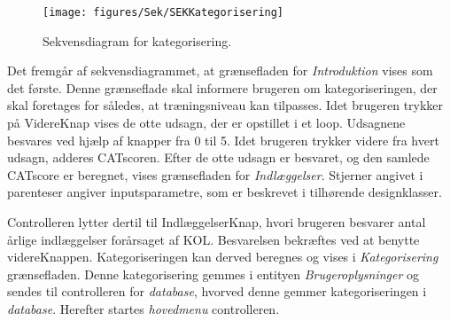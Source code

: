 \begin{figure} [H]
\centering
\texttt{[image: figures/Sek/SEKKategorisering]}
\caption{Sekvensdiagram for kategorisering.}
\label{fig:SEKKategorisering}
\end{figure}

\noindent
Det fremgår af sekvensdiagrammet, at grænsefladen for \textit{Introduktion} vises som det første. Denne grænseflade skal informere brugeren om kategoriseringen, der skal foretages for således, at træningsniveau kan tilpasses. Idet brugeren trykker på VidereKnap vises de otte udsagn, der er opstillet i et loop. Udsagnene besvares ved hjælp af knapper fra 0 til 5. Idet brugeren trykker videre fra hvert udsagn, adderes CATscoren. Efter de otte udsagn er besvaret, og den samlede CATscore er beregnet, vises grænsefladen for \textit{Indlæggelser}. Stjerner angivet i parenteser angiver inputsparametre, som er beskrevet i tilhørende designklasser.


Controlleren lytter dertil til IndlæggelserKnap, hvori brugeren besvarer antal årlige indlæggelser forårsaget af KOL. Besvarelsen bekræftes ved at benytte videreKnappen. Kategoriseringen kan derved beregnes og vises i \textit{Kategorisering} grænsefladen. Denne kategorisering gemmes i entityen \textit{Brugeroplysninger} og sendes til controlleren for \textit{database}, hvorved denne gemmer kategoriseringen i \textit{database}. Herefter startes \textit{hovedmenu} controlleren. 
